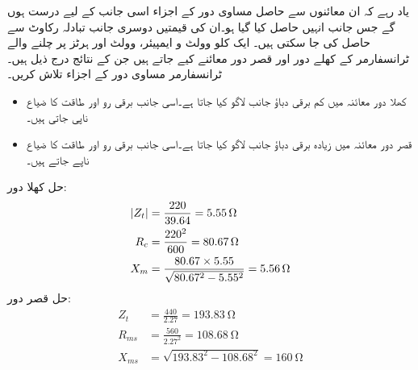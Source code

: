 یاد رہے کہ ان معائنوں سے حاصل مساوی دور کے  اجزاء اسی جانب کے لیے درست ہوں گے جس جانب انہیں حاصل کیا گیا ہو۔ان کی قیمتیں دوسری جانب تبادلہ رکاوٹ سے حاصل کی جا سکتی ہیں۔ 
%
ایک   کلو وولٹ و ایمپیئر،  وولٹ اور  ہرٹز پر چلنے والے ٹرانسفارمر کے کھلے دور اور قصر دور معائنے کیے جاتے ہیں جن کے نتائج درج ذیل ہیں۔ ٹرانسفارمر مساوی دور کے اجزاء تلاش کریں۔
\begin{itemize}
\item
کھلا دور معائنہ میں کم برقی دباؤ جانب   لاگو کیا جاتا ہے۔اسی جانب برقی رو  اور طاقت کا ضیاع  ناپی  جاتی  ہیں۔
\item
قصر دور معائنہ میں زیادہ برقی دباؤ جانب   لاگو کیا جاتا ہے۔اسی جانب برقی رو  اور طاقت کا ضیاع  ناپے جاتے ہیں۔
\end{itemize}

حل کھلا دور:
\begin{align*}
\abs{Z_t}&=\frac{220}{39.64}=\SI{5.55}{\ohm}\\
R_c&=\frac{220^2}{600}=\SI{80.67}{\ohm}\\
X_m&=\frac{80.67 \times 5.55}{\sqrt{80.67^2-5.55^2}}=\SI{5.56}{\ohm}
\end{align*}
حل قصر دور:
\begin{align*}
Z_t&=\frac{440}{2.27}=\SI{193.83}{\ohm}\\
R_{ms}&=\frac{560}{2.27^2}=\SI{108.68}{\ohm}\\
X_{ms}&=\sqrt{193.83^2-108.68^2}=\SI{160}{\ohm}
\end{align*}

